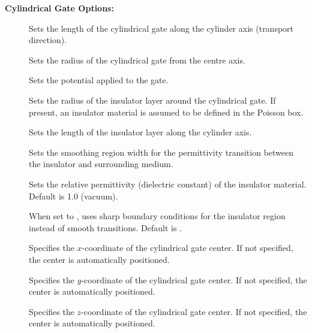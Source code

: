 {\bf Cylindrical Gate Options:}
\begin{description}
\item[] Sets the length of the cylindrical
  gate along the cylinder axis (transport direction).
\item[] Sets the radius of the cylindrical
  gate from the centre axis.
\item[] Sets the potential applied to
  the gate.
\item[] Sets the radius of the
  insulator layer around the cylindrical gate. If present, an insulator
  material is assumed to be defined in the Poisson box.
\item[] Sets the length of the
  insulator layer along the cylinder axis.
\item[] Sets the smoothing region width
  for the permittivity transition between the insulator and surrounding medium.
\item[] Sets the relative
  permittivity (dielectric constant) of the insulator material. Default is 1.0
  (vacuum).
\item[] When set to , uses sharp boundary
  conditions for the insulator region instead of smooth transitions. Default is
  .
\item[] Specifies the $x$-coordinate of the cylindrical gate
  center. If not specified, the center is automatically positioned.
\item[] Specifies the $y$-coordinate of the cylindrical gate
  center. If not specified, the center is automatically positioned.
\item[] Specifies the $z$-coordinate of the cylindrical gate
  center. If not specified, the center is automatically positioned.
\end{description}

